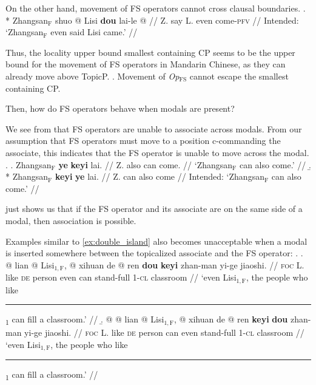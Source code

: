 \documentclass[11pt]{article}
\let\latextextsubscript\textsubscript
\let\textsubscript\latextextsubscript
\newcommand{\gap}[1]{\rule{1em}{0.4pt}\textsubscript{#1}}
\newcommand{\F}{\ensuremath{_{\mathrm{F}}}}
\newcommand{\opfs}{\textit{Op}\(_{\mathrm{FS}}\)}
\begin{document}
On the other hand, movement of FS operators cannot cross clausal boundaries.
\ex. *\begingl
\gla Zhangsan\F{} shuo \nogloss{\I{[}CP {} } @ Lisi \textbf{dou} lai-le @ \nogloss{]} //
  \glb Z. say L. even come-\textsc{pfv} //
  \glft Intended: `Zhangsan\F{} even said Lisi came.' //
\endgl


Thus, the locality upper bound smallest containing CP seems to be the upper bound for the movement of FS operators in Mandarin Chinese, as they can already move above TopicP.
\ex. Movement of \opfs{} cannot escape the smallest containing CP. \label{ex:loc_cons}

Then, how do FS operators behave when modals are present?

We see from \Next[b] that FS operators are unable to associate across modals.
From our assumption that FS operators must move to a position c-commanding the associate, this indicates that the FS operator is unable to move across the modal.
\ex. \label{ex:fs_modal}
\a. \begingl
  \gla Zhangsan\F{} \textbf{ye} \textbf{keyi} lai. //
  \glb Z. also can come. //
  \glft `Zhangsan\F{} can also come.' //
\endgl
\b. *\begingl
\gla Zhangsan\F{} \textbf{keyi} \textbf{ye} lai. //
  \glb Z. can also come //
  \glft Intended: `Zhangsan\F{} can also come.' //
\endgl

\Last[a] just shows us that if the FS operator and its associate are on the same side of a modal, then association is possible.

Examples similar to \cref{ex:double_island} also becomes unacceptable when a modal is inserted somewhere between the topicalized associate and the FS operator:
\ex. \label{ex:double_island_modal} 
\a. \begingl
\gla \nogloss{(} @ lian @ \nogloss{)} Lisi\(_{1, \mathrm{F}}\), \nogloss{\I{[}RC {} } @ xihuan \nogloss{\gap{1}} de @ \nogloss{]} ren \textbf{dou} \textbf{keyi} zhan-man yi-ge jiaoshi. //
  \glb \textsc{foc} L. like \textsc{de} person even can stand-full 1-\textsc{cl} classroom //
  \glft `even Lisi\(_{1, \mathrm{F}}\), the people who like \gap{1} can fill a classroom.' //
\endgl
\b. \begingl
\gla \nogloss{\ljudge{*}} @ \nogloss{(} @ lian @ \nogloss{)} Lisi\(_{1, \mathrm{F}}\), \nogloss{\I{[}RC {} } @ xihuan \nogloss{\gap{1}} de @ \nogloss{]} ren \textbf{keyi} \textbf{dou} zhan-man yi-ge jiaoshi. //
  \glb \textsc{foc} L. like \textsc{de} person can even stand-full 1-\textsc{cl} classroom //
  \glft `even Lisi\(_{1, \mathrm{F}}\), the people who like \gap{1} can fill a classroom.' //
\endgl
\end{document}
